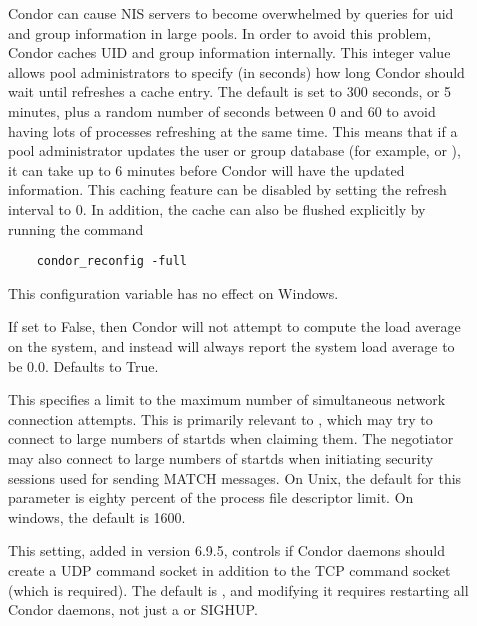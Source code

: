 \begin{description}
\item[]
  \label{param:PasswdCacheRefresh}
  Condor can cause NIS servers to become overwhelmed by queries for uid
  and group information in large pools. In order to avoid this problem,
  Condor caches UID and group information internally. This integer value allows
  pool administrators to specify (in seconds) how long Condor should wait
  until refreshes a cache entry. The default is set to 300 seconds, or
  5 minutes, plus a random number of seconds between 0 and 60 to avoid
  having lots of processes refreshing at the same time.
  This means that if a pool administrator updates the user
  or group database (for example,  or ),
  it can take up
  to 6 minutes before Condor will have the updated information. This
  caching feature can be disabled by setting the refresh interval to
  0. In addition, the cache can also be flushed explicitly by running
  the command
  \begin{verbatim}
    condor_reconfig -full
  \end{verbatim}
  This configuration variable has no effect on Windows.
\item[] \label{param:SysapiGetLoadavg}
  If set to False, then Condor will not attempt to compute the load average
  on the system, and instead will always report the system load average
  to be 0.0.  Defaults to True.

\item[] \label{param:NetworkMaxPendingConnects}
  This specifies a limit to the maximum number of simultaneous network
  connection attempts.  This is primarily relevant to ,
  which may try to connect to large numbers of startds when claiming
  them.  The negotiator may also connect to large numbers of startds
  when initiating security sessions used for sending MATCH messages.  On
  Unix, the default for this parameter is eighty percent of the process file
  descriptor limit.  On windows, the default is 1600.

\item[] \label{param:WantUDPCommandSocket}
  This setting, added in version 6.9.5, controls if Condor daemons
  should create a UDP command socket in addition to the TCP command
  socket (which is required).
  The default is , and modifying it requires restarting all
  Condor daemons, not just a  or SIGHUP.


\end{description}
